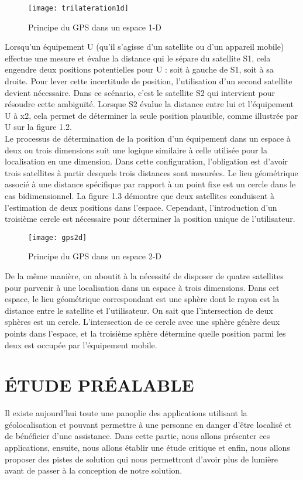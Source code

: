\begin{figure}[H]
	\texttt{[image: trilateration1d]}
	\caption{Principe du GPS dans un espace 1-D}
\end{figure}

Lorsqu'un équipement U (qu'il s'agisse d'un satellite ou d'un appareil mobile) effectue une mesure et évalue la distance qui le sépare du satellite S1, cela engendre deux positions potentielles pour U : soit à gauche de S1, soit à sa droite. Pour lever cette incertitude de position, l'utilisation d'un second satellite devient nécessaire. Dans ce scénario, c'est le satellite S2 qui intervient pour résoudre cette ambiguïté. Lorsque S2 évalue la distance entre lui et l'équipement U à x2, cela permet de déterminer la seule position plausible, comme illustrée par U sur la figure 1.2.\\

Le processus de détermination de la position d'un équipement dans un espace à deux ou trois dimensions suit une logique similaire à celle utilisée pour la localisation en une dimension. Dans cette configuration, l'obligation est d'avoir trois satellites à partir desquels trois distances sont mesurées. Le lieu géométrique associé à une distance spécifique par rapport à un point fixe est un cercle dans le cas bidimensionnel. La figure 1.3 démontre que deux satellites conduisent à l'estimation de deux positions dans l'espace. Cependant, l'introduction d'un troisième cercle est nécessaire pour déterminer la position unique de l'utilisateur.

\begin{figure}[H]
	\centering
	\texttt{[image: gps2d]}
	\caption{Principe du GPS dans un espace 2-D}
\end{figure}

De la même manière, on aboutit à la nécessité de disposer de quatre satellites pour parvenir à une localisation dans un espace à trois dimensions. Dans cet espace, le lieu géométrique correspondant est une sphère dont le rayon est la distance entre le satellite et l'utilisateur. On sait que l'intersection de deux sphères est un cercle. L'intersection de ce cercle avec une sphère génère deux points dans l'espace, et la troisième sphère détermine quelle position parmi les deux est occupée par l'équipement mobile.

\section{ÉTUDE PRÉALABLE}
Il existe aujourd’hui toute une panoplie des applications utilisant la géolocalisation et pouvant permettre à une personne en danger d’être localisé et de bénéficier d’une assistance. Dans cette partie, nous allons présenter ces applications, ensuite, nous allons établir une étude critique et enfin, nous allons proposer des pistes de solution qui nous permettront d’avoir plus de lumière avant de passer à la conception de notre solution.


